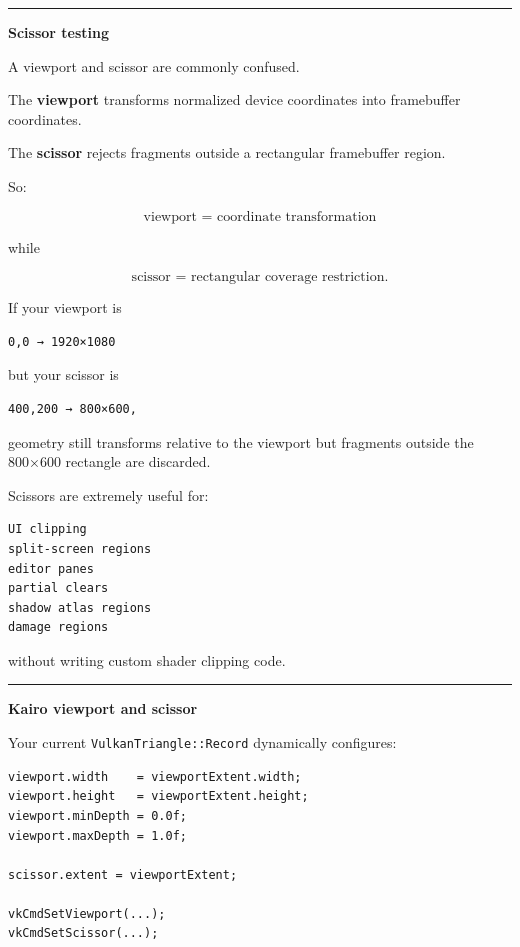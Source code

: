 \begin{center}\rule{0.5\linewidth}{0.5pt}\end{center}

\textbf{Scissor testing}

A viewport and scissor are commonly confused.

The \textbf{viewport} transforms normalized device coordinates into framebuffer coordinates.

The \textbf{scissor} rejects fragments outside a rectangular framebuffer region.

So:

\[
\boxed{\text{viewport = coordinate transformation}}
\]

while

\[
\boxed{\text{scissor = rectangular coverage restriction}}.
\]

If your viewport is

\begin{verbatim}
0,0 → 1920×1080
\end{verbatim}

but your scissor is

\begin{verbatim}
400,200 → 800×600,
\end{verbatim}

geometry still transforms relative to the viewport but fragments outside the 800×600 rectangle are discarded.

Scissors are extremely useful for:

\begin{verbatim}
UI clipping
split-screen regions
editor panes
partial clears
shadow atlas regions
damage regions
\end{verbatim}

without writing custom shader clipping code.

\begin{center}\rule{0.5\linewidth}{0.5pt}\end{center}

\textbf{Kairo viewport and scissor}

Your current \texttt{VulkanTriangle::Record} dynamically configures:

\begin{verbatim}
viewport.width    = viewportExtent.width;
viewport.height   = viewportExtent.height;
viewport.minDepth = 0.0f;
viewport.maxDepth = 1.0f;

scissor.extent = viewportExtent;

vkCmdSetViewport(...);
vkCmdSetScissor(...);
\end{verbatim}


